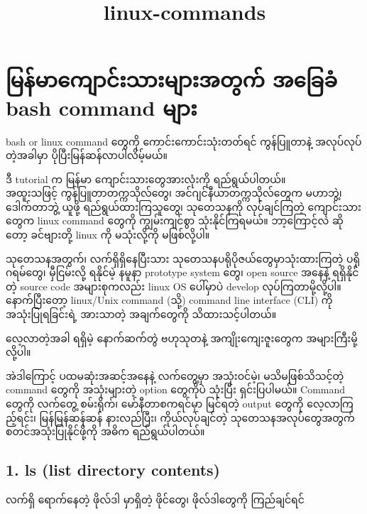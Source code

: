 \documentclass[11pt]{article}
\title{linux-commands}
\begin{document}
    
    
    \maketitle
    
    

    
    \section{\texorpdfstring{မြန်မာကျောင်းသားများအတွက် အခြေခံ bash command
များ}{မြန်မာကျောင်းသားများအတွက်  အခြေခံ bash command များ}}\label{ux1019ux1014ux1019ux1000ux1004ux101eux1019ux1021ux1010ux1000-ux1021ux1001ux1001-bash-command-ux1019}

    bash or linux command တွေကို ကောင်းကောင်းသုံးတတ်ရင် ကွန်ပြူတာနဲ့
အလုပ်လုပ်တဲ့အခါမှာ ပိုပြီးမြန်ဆန်လာပါလိမ့်မယ်။

ဒီ tutorial က မြန်မာ ကျောင်းသားတွေအားလုံးကို ရည်ရွယ်ပါတယ်။\\
အထူးသဖြင့် ကွန်ပြူတာတက္ကသိုလ်တွေ၊ အင်ဂျင်နီယာတက္ကသိုလ်တွေက မဟာဘွဲ့၊
ဒေါက်တာဘွဲ့ ယူဖို့ ရည်ရွယ်ထားကြသူတွေ၊ သုတေသနကို လုပ်ချင်ကြတဲ့
ကျောင်းသားတွေက linux command တွေကို ကျွမ်းကျင်စွာ သုံးနိုင်ကြရမယ်။
ဘာ့ကြောင့်လဲ ဆိုတော့ ခင်ဗျားတို့ linux ကို မသုံးလို့ကို မဖြစ်လို့ပါ။

သုတေသနအတွက်၊ လက်ရှိရှိနေပြီးသား သုတေသနပရိုပိုဇယ်တွေမှာသုံးထားကြတဲ့
ပရိုဂရမ်တွေ၊ မှီငြမ်းလို့ ရနိုင်မဲ့ နမူနာ prototype system တွေ၊ open
source အနေနဲ့ ရရှိနိုင်တဲ့ source code အများစုကလည်း linux OS ပေါ်မှာပဲ
develop လုပ်ကြတာမို့လို့ပါ။ နောက်ပြီးတော့ linux/Unix command (သို့)
command line interface (CLI) ကို အသုံးပြုရခြင်းရဲ့ အားသာတဲ့ အချက်တွေကို
သိထားသင့်ပါတယ်။

လေ့လာတဲ့အခါ ရရှိမဲ့ နောက်ဆက်တွဲ ဗဟုသုတနဲ့ အကျိုးကျေးဇူးတွေက
အများကြီးမို့လို့ပါ။ 　　

အဲဒါကြောင့် ပထမဆုံးအဆင့်အနေနဲ့ လက်တွေ့မှာ အသုံးဝင်မဲ့၊ မသိမဖြစ်သိသင့်တဲ့
command တွေကို အသုံးများတဲ့ option တွေကိုပဲ သုံးပြီး ရှင်းပြပါမယ်။
Command တွေကို လက်တွေ့ စမ်းရိုက်၊ မော်နီတာစကရင်မှာ မြင်ရတဲ့ output
တွေကို လေ့လာကြည့်ရင်း၊ မြန်မြန်ဆန်ဆန် နားလည်ပြီး၊ ကိုယ်လုပ်ချင်တဲ့
သုတေသနအလုပ်တွေအတွက် စတင်အသုံးပြုနိုင်ဖို့ကို အဓိက ရည်ရွယ်ပါတယ်။ 　

\subsection{1. ls (list directory
contents)}\label{ls-list-directory-contents}

လက်ရှိ ရောက်နေတဲ့ ဖိုလ်ဒါ မှာရှိတဲ့ ဖိုင်တွေ၊ ဖိုလ်ဒါတွေကို ကြည်ချင်ရင်
\end{document}
